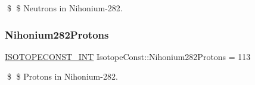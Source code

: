 \$ \$ Neutrons in Nihonium-\/282. \mbox{\label{group___isotope_const-_nihonium-_nh282_ga09bfeca39c484d45c4d5fe451294c95a}} 
\subsubsection{\texorpdfstring{Nihonium282\+Protons}{Nihonium282Protons}}
{\footnotesize\ttfamily \mbox{\hyperlink{group___isotope_const-_macros_ga5f18360b3e99483a35c32d789e62621c}{I\+S\+O\+T\+O\+P\+E\+C\+O\+N\+S\+T\+\_\+\+I\+NT}} Isotope\+Const\+::\+Nihonium282\+Protons = 113}

\$ \$ Protons in Nihonium-\/282. 